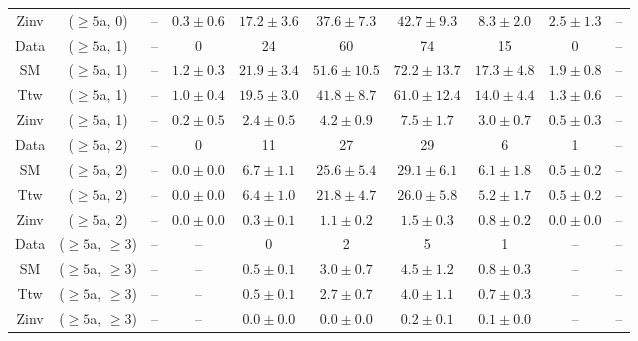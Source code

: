 \begin{table}[h!]
{\begin{tabular}{cccccccccc}
	Zinv & ($\ge5$a, 0) & -- & $0.3\pm 0.6$ & $17.2\pm 3.6$ & $37.6\pm 7.3$ & $42.7\pm 9.3$ & $8.3\pm 2.0$ & $2.5\pm 1.3$ & -- \\[0.5ex] 
	Data & ($\ge5$a, 1) & -- & 0 & 24 & 60 & 74 & 15 & 0 & -- \\[0.5ex] 
	SM & ($\ge5$a, 1) & -- & $1.2\pm 0.3$ & $21.9\pm 3.4$ & $51.6\pm 10.5$ & $72.2\pm 13.7$ & $17.3\pm 4.8$ & $1.9\pm 0.8$ & -- \\[0.5ex] 
	Ttw & ($\ge5$a, 1) & -- & $1.0\pm 0.4$ & $19.5\pm 3.0$ & $41.8\pm 8.7$ & $61.0\pm 12.4$ & $14.0\pm 4.4$ & $1.3\pm 0.6$ & -- \\[0.5ex] 
	Zinv & ($\ge5$a, 1) & -- & $0.2\pm 0.5$ & $2.4\pm 0.5$ & $4.2\pm 0.9$ & $7.5\pm 1.7$ & $3.0\pm 0.7$ & $0.5\pm 0.3$ & -- \\[0.5ex] 
	Data & ($\ge5$a, 2) & -- & 0 & 11 & 27 & 29 & 6 & 1 & -- \\[0.5ex] 
	SM & ($\ge5$a, 2) & -- & $0.0\pm 0.0$ & $6.7\pm 1.1$ & $25.6\pm 5.4$ & $29.1\pm 6.1$ & $6.1\pm 1.8$ & $0.5\pm 0.2$ & -- \\[0.5ex] 
	Ttw & ($\ge5$a, 2) & -- & $0.0\pm 0.0$ & $6.4\pm 1.0$ & $21.8\pm 4.7$ & $26.0\pm 5.8$ & $5.2\pm 1.7$ & $0.5\pm 0.2$ & -- \\[0.5ex] 
	Zinv & ($\ge5$a, 2) & -- & $0.0\pm 0.0$ & $0.3\pm 0.1$ & $1.1\pm 0.2$ & $1.5\pm 0.3$ & $0.8\pm 0.2$ & $0.0\pm 0.0$ & -- \\[0.5ex] 
	Data & ($\ge5$a, $\ge3$) & -- & -- & 0 & 2 & 5 & 1 & -- & -- \\[0.5ex] 
	SM & ($\ge5$a, $\ge3$) & -- & -- & $0.5\pm 0.1$ & $3.0\pm 0.7$ & $4.5\pm 1.2$ & $0.8\pm 0.3$ & -- & -- \\[0.5ex] 
	Ttw & ($\ge5$a, $\ge3$) & -- & -- & $0.5\pm 0.1$ & $2.7\pm 0.7$ & $4.0\pm 1.1$ & $0.7\pm 0.3$ & -- & -- \\[0.5ex] 
	Zinv & ($\ge5$a, $\ge3$) & -- & -- & $0.0\pm 0.0$ & $0.0\pm 0.0$ & $0.2\pm 0.1$ & $0.1\pm 0.0$ & -- & -- \\[0.5ex] 
	\hline
	\hline
\end{tabular}}
\end{table}
